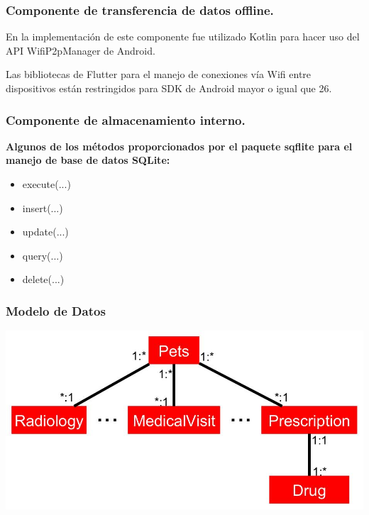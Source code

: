 \documentclass[14pt]{beamer}
\begin{document}
\begin{frame}
\frametitle{Componente de transferencia de datos offline.}

\begin{block}{}
En la implementación de este componente fue utilizado Kotlin para hacer uso del API WifiP2pManager de Android.

Las bibliotecas de Flutter para el manejo de conexiones vía Wifi entre dispositivos están restringidos para SDK de Android mayor o igual que 26.
\end{block}

\end{frame}

\begin{frame}
\frametitle{Componente de almacenamiento interno.}

\textbf{Algunos de los métodos proporcionados por el paquete sqflite para el manejo de base de datos SQLite:}

\begin{itemize}


\item execute(...)
\item insert(...)
\item update(...)
\item query(...)
\item delete(...)
\end{itemize}

\end{frame}



\begin{frame}
\frametitle{Modelo de Datos}

\begin{center}

\includegraphics[scale =0.35]{Images/symplifiedClass.jpg}

\end{center}


\end{frame}
\end{document}
